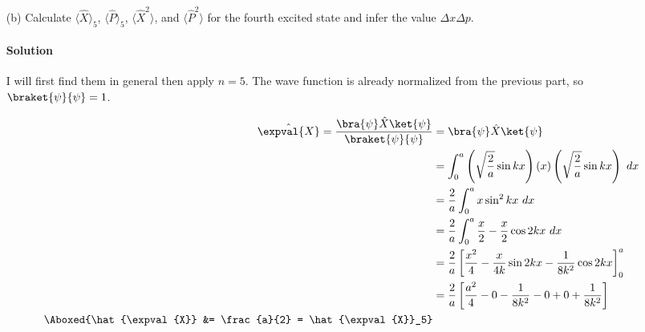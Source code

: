 \documentclass{article}
\begin{document}
\begin{enumerate}
\clearpage

		\item[(b)] Calculate $\langle\hat{X}\rangle_5$, $\langle\hat{P}\rangle_5$, $\langle\hat{X}^2\rangle$, and $\langle\hat{P}^2\rangle$ for the fourth excited state and infer the value $\Delta x \Delta p$.
		\paragraph{Solution} I will first find them in general then apply $n=5$. The wave function is already normalized from the previous part, so $\braket{\psi}{\psi}=1$.
		
		\begin{equation}
			\begin{split}
				\hat{\expval{X}} = \frac{\bra{\psi}\hat{X}\ket{\psi}}{\braket{\psi}{\psi}} &= \bra{\psi}\hat{X}\ket{\psi} \\
				&= \int_{0}^{a} \left( \sqrt{\frac{2}{a}} \sin kx \right) (x) \left( \sqrt{\frac{2}{a}} \sin kx \right) \ dx \\
				&= \frac{2}{a} \int_{0}^{a} x \sin^2 kx \ dx \\
				&= \frac{2}{a} \int_{0}^{a} \frac{x}{2} - \frac{x}{2} \cos 2kx \ dx \\
				&= \frac{2}{a} \left[ \frac{x^2}{4} - \frac{x}{4k} \sin 2kx - \frac{1}{8k^2} \cos 2kx \right]^a_0 \\
				&= \frac{2}{a} \left[ \frac{a^2}{4} - 0 - \frac{1}{8k^2} - 0 + 0 + \frac{1}{8k^2} \right] \\
				\Aboxed{\hat{\expval{X}} &= \frac{a}{2} = \hat{\expval{X}}_5}
			\end{split}
		\end{equation}
		

\end{enumerate}
\end{document}
